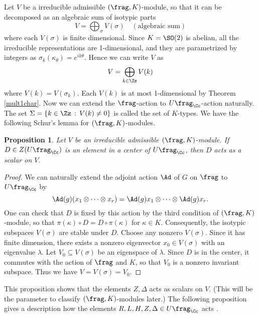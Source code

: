 \documentclass{article}
\newtheorem{proposition}{Proposition}[section]
\begin{document}
Let $V$ be a irreducible admissible $(\frag, K)$-module, so that it can be decomposed as an algebraic sum of isotypic parts 
$$
V = \bigoplus _{\sigma} V(\sigma)\quad (\text{algebraic sum})
$$
where each $V(\sigma)$ is finite dimensional. 
Since $K = \SO(2)$ is abelian, all the irreducible representations are 1-dimensional, and they are parametrized by integers as $\sigma_{k}(\kappa_{\theta}) = e^{ik\theta}$. Hence we can write $V$ as
$$
V = \bigoplus_{k\in \Zz} V(k)
$$
where $V(k) = V(\sigma_{k})$. 
Each $V(k)$ is at most 1-dimensional by Theorem \ref{mult1char}.   Now we can extend the $\frag$-action to $U\frag_{\Cc}$-action naturally. 
The set $\Sigma = \{k\in \Zz\,:\, V(k)\neq 0\}$ is called the set of $K$-types. 
We have the following Schur's lemma for $(\frag, K)$-modules. 
\begin{proposition}
Let $V$ be an irreducible admissible $(\frag, K)$-module. If $D\in Z(U\frag_{\Cc})$ is an element in a center of $U\frag_{\Cc}$, then $D$ acts as a scalar on $V$. 
\end{proposition}
\begin{proof}
We can naturally extend the adjoint action $\Ad$ of $G$ on $\frag$ to $U\frag_{\Cc}$ by 
$$
\Ad(g) (x_{1}\otimes \cdots \otimes x_{r}) = \Ad(g)x_{1} \otimes \cdots \otimes \Ad(g)x_{r}. 
$$
One can check that $D$ is fixed by this action by the third condition of $(\frag, K)$-module, so that $\pi(\kappa)\circ D = D\circ \pi(\kappa)$ for $\kappa\in K$. 
Consequently, the isotypic subspaces $V(\sigma)$ are stable under $D$. 
Choose any nonzero $V(\sigma)$. Since it has finite dimension, there exists a nonzero eigenvector $x_{0}\in V(\sigma)$ with an eigenvalue $\lambda$. Let $V_{0}\subseteq V(\sigma)$ be an eigenspace of $\lambda$. 
Since $D$ is in the center, it commutes with the action of $\frag$ and $K$, so that $V_{0}$ is a nonzero invariant subspace. Thus we have $V = V(\sigma) = V_{0}$. 
\end{proof}
This proposition shows that the elements $Z, \Delta$ acts as scalars on $V$. (This will be the parameter to classify $(\frag, K)$-modules later.) 
The following proposition gives a description how the elements $R, L, H, Z, \Delta \in U\frag_{\Cc}$ acts . 
\end{document}
